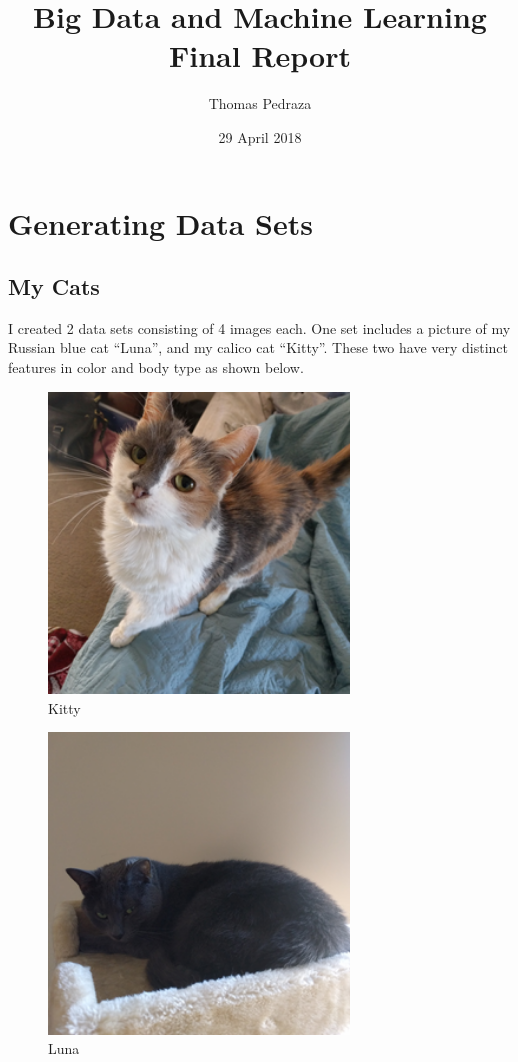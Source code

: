 \documentclass[12pt, letterpaper]{article}
\title{Big Data and Machine Learning Final Report}
\author{Thomas Pedraza}
\date{29 April 2018}
\begin{document}
\begin{titlepage}
\maketitle
\end{titlepage}

\section{Generating Data Sets}

\subsection{My Cats}

I created 2 data sets consisting of 4 images each. One set includes a picture of my Russian blue cat “Luna”, and my calico cat “Kitty”. These two have very distinct features in color and body type as shown below. \\

\begin{figure}[H]
\centering
\includegraphics[width=8cm]{kitty}
\caption{Kitty}
\label{fig:kitty}
\end{figure}

\begin{figure}[H]
\centering
\includegraphics[width=8cm]{luna}
\caption{Luna}
\label{fig:luna}
\end{figure}
\end{document}
